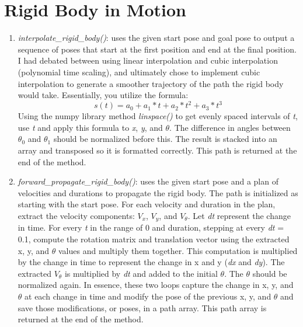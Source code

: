 \documentclass{article}
\begin{document}
\section{Rigid Body in Motion}
\begin{enumerate}
\item \textit{interpolate\_rigid\_body()}: uses the given start pose and goal pose to output a sequence of poses that start at the first position and end at the final position. I had debated between using linear interpolation and cubic interpolation (polynomial time scaling), and ultimately chose to implement cubic interpolation to generate a smoother trajectory of the path the rigid body would take. Essentially, you utilize the formula:
\[s(t)=a_0+a_1*t+a_2*t^2+a_3*t^3\]
Using the numpy library method \textit{linspace()} to get evenly spaced intervals of \textit{t}, use \textit{t} and apply this formula to \textit{x}, \textit{y}, and \(\theta\). The difference in angles between \(\theta_0\) and \(\theta_1\) should be normalized before this. The result is stacked into an array and transposed so it is formatted correctly. This path is returned at the end of the method.

\item \textit{forward\_propagate\_rigid\_body()}: uses the given start pose and a plan of velocities and durations to propagate the rigid body. The path is initialized as starting with the start pose. For each velocity and duration in the plan, extract the velocity components: \(V_x\), \(V_y\), and \(V_\theta\). Let \textit{dt} represent the change in time. For every \textit{t} in the range of 0 and duration, stepping at every \textit{dt} = 0.1, compute the rotation matrix and translation vector using the extracted x, y, and \(\theta\) values and multiply them together. This computation is multiplied by the change in time to represent the change in x and y (\textit{dx} and \textit{dy}). The extracted \(V_\theta\) is multiplied by \textit{dt} and added to the initial \(\theta\). The \(\theta\) should be normalized again. In essence, these two loops capture the change in x, y, and \(\theta\) at each change in time and modify the pose of the previous x, y, and \(\theta\) and save those modifications, or poses, in a path array. This path array is returned at the end of the method.


\end{enumerate}
\end{document}

